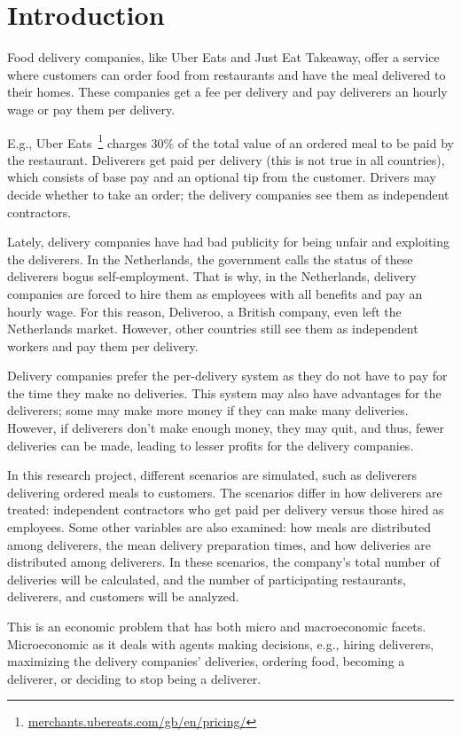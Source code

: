 
\section{Introduction}\label{sec:introduction}

Food delivery companies, like Uber Eats and Just Eat Takeaway, offer a service where customers can order food from restaurants and have the meal delivered to their homes.
These companies get a fee per delivery and pay deliverers an hourly wage or pay them per delivery.

E.g., Uber Eats~\footnote{\url{merchants.ubereats.com/gb/en/pricing/}} charges 30\% of the total value of an ordered meal to be paid by the restaurant.
Deliverers get paid per delivery (this is not true in all countries), which consists of base pay and an optional tip from the customer.
Drivers may decide whether to take an order; the delivery companies see them as independent contractors.

Lately, delivery companies have had bad publicity for being unfair and exploiting the deliverers.
In the Netherlands, the government calls the status of these deliverers bogus self-employment.
That is why, in the Netherlands, delivery companies are forced to hire them as employees with all benefits and pay an hourly wage.
For this reason, Deliveroo, a British company, even left the Netherlands market.
However, other countries still see them as independent workers and pay them per delivery.

Delivery companies prefer the per-delivery system as they do not have to pay for the time they make no deliveries.
This system may also have advantages for the deliverers; some may make more money if they can make many deliveries.
However, if deliverers don't make enough money, they may quit, and thus, fewer deliveries can be made, leading to lesser profits for the delivery companies.

In this research project, different scenarios are simulated, such as deliverers delivering ordered meals to customers.
The scenarios differ in how deliverers are treated: independent contractors who get paid per delivery versus
those hired as employees.
Some other variables are also examined: how meals are distributed among deliverers, the mean delivery preparation times, and how deliveries are distributed among deliverers.
In these scenarios, the company's total number of deliveries will be calculated, and the number of participating restaurants, deliverers, and customers will be analyzed.

This is an economic problem that has both micro and macroeconomic facets.
Microeconomic as it deals with agents making decisions, e.g., hiring deliverers, maximizing the delivery companies' deliveries, ordering food, becoming a deliverer, or deciding to stop being a deliverer.

